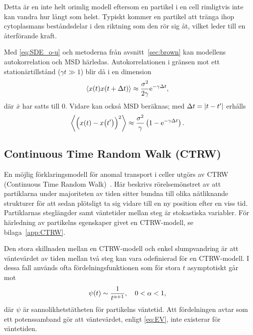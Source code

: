Detta är en inte helt orimlig modell eftersom en partikel i en cell rimligtvis inte kan vandra hur långt som helst. Typiskt kommer en partikel att tränga ihop cytoplasmans beståndsdelar i den riktning som den rör sig åt, vilket leder till en återförande kraft.

Med \eqref{eq:SDE_o-u} och metoderna från avsnitt~\ref{sec:brown} kan modellens autokorrelation och MSD härledas. Autokorrelationen i gränsen mot ett stationärtillstånd ($\gamma t\gg 1$) blir då i en dimension
\begin{equation}\label{eq:COV_o-u}
\ev{x(t)x(t+\Delta{t})} \approx \frac{\sigma^2}{2\gamma} \ee^{-\gamma\Delta{t}},
\end{equation}
där $\bar{x}$ har satts till 0. Vidare kan också MSD beräknas; med $\Delta{t}=\abs{t-t'}$ erhålls
\begin{equation}\label{eq:MSD_o-u}
\ev{\Big(x(t)-x\big(t'\big) \Big)^2} 
\approx \frac{\sigma^2}{\gamma} \left( 1-\ee^{-\gamma \Delta{t}} \right).
\end{equation}



\subsection{Continuous Time Random Walk (CTRW)}
En möjlig förklaringsmodell för anomal transport i celler utgörs av CTRW (Continuous Time Random Walk)~\cite{Hofling&Franosch2013}. Här beskrivs rörelsemönstret av att partiklarna under majoriteten av tiden sitter bundna till olika nätliknande strukturer för att sedan plötsligt ta sig vidare till en ny position efter en viss tid. Partiklarnas steglängder samt väntetider mellan steg är stokastiska variabler. För härledning av partikelns egenskaper givet en CTRW-modell, se bilaga~\ref{app:CTRW}. 

Den stora skillnaden mellan en CTRW-modell och enkel slumpvandring är att väntevärdet av tiden mellan två steg kan vara odefinierad för en CTRW-modell. I dessa fall används ofta \cite{Hofling&Franosch2013} fördelningsfunktionen som för stora $t$ asymptotiskt går mot
\begin{equation}
\psi(t) \sim \frac{1}{t^{\alpha+1}}\qcomma 0<\alpha<1,
\end{equation}
där $\psi$ är sannolikhetstätheten för partikelns väntetid. Att fördelningen avtar som ett potenssamband gör att väntevärdet, enligt \eqref{eq:EV}, inte existerar för väntetiden.


